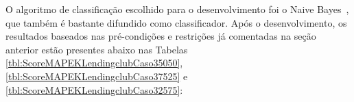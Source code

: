 \documentclass{article}
\begin{document}
O algoritmo de classificação escolhido para o desenvolvimento foi o Naive Bayes~\citep{Naive_Bayes_2004}, que também é bastante difundido como classificador. Após o desenvolvimento, os resultados baseados nas pré-condições e restrições já comentadas na seção anterior estão presentes abaixo nas Tabelas \ref{tbl:ScoreMAPEKLendingclubCaso35050}, \ref{tbl:ScoreMAPEKLendingclubCaso37525} e \ref{tbl:ScoreMAPEKLendingclubCaso32575}:

\begin{table}[H]
\begin{center}
  \caption{Melhores opções escolhidas pelo modelo MAPE-K \\ Todos os métodos - 50\% Performance/50\% Fairness}
\label{tbl:ScoreMAPEKLendingclubCaso35050}
\end{center}
\end{table}
\end{document}
